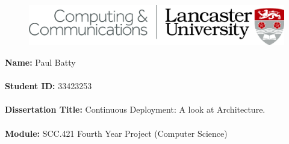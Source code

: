 %
%
%
%
%
%

\vspace*{\fill}

\begin{figure}[H]
	\raggedleft
	\includegraphics[scale=1]{images/dec_head.jpg}
\end{figure}
\vspace{1cm}

\textbf{Name:} Paul Batty\\\\
\textbf{Student ID:} 33423253\\\\
\textbf{Dissertation Title:} Continuous Deployment: A look at Architecture.\\\\
\textbf{Module:} SCC.421 Fourth Year Project (Computer Science) \\\\

